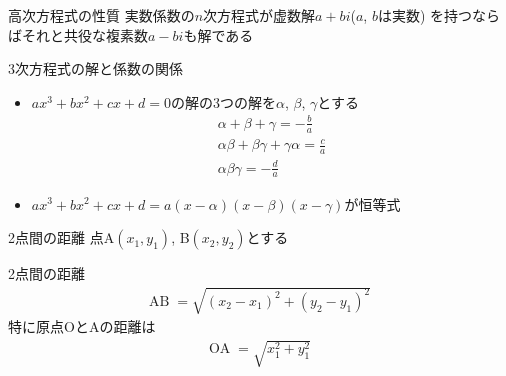 \documentclass[aspectratio=169, 12pt]{beamer} %
\begin{document}
\begin{frame}{高次方程式の性質}
    実数係数の$n$次方程式が虚数解$a+bi$\space($a$, $b$は実数) を持つならばそれと共役な複素数$a-bi$も解である
\end{frame}
\begin{frame}{3次方程式の解と係数の関係}
    \begin{itemize}
        \item $ax^3+bx^2+cx+d=0$の解の3つの解を$\alpha$, $\beta$, $\gamma$とする
              \begin{eqnarray*}
                  \alpha+\beta+\gamma =-\frac{b}{a} \\
                  \alpha\beta+\beta\gamma+\gamma\alpha=\frac{c}{a} \\
                  \alpha\beta\gamma=-\frac{d}{a}
              \end{eqnarray*}
        \item $ax^3+bx^2+cx+d=a(x-\alpha)(x-\beta)(x-\gamma)$が恒等式
    \end{itemize}
\end{frame}
\begin{frame}{2点間の距離}
    点A$(x_1,y_1)$, B$(x_2, y_2)$とする \par
    2点間の距離
    \begin{eqnarray*}
        \text{AB}\;=\sqrt{(x_2-x_1)^2+(y_2-y_1)^2}
    \end{eqnarray*}
    特に原点OとAの距離は
    \begin{eqnarray*}
        \text{OA}\;=\sqrt{x_1^2+y_1^2}
    \end{eqnarray*}
\end{frame}
\end{document}
